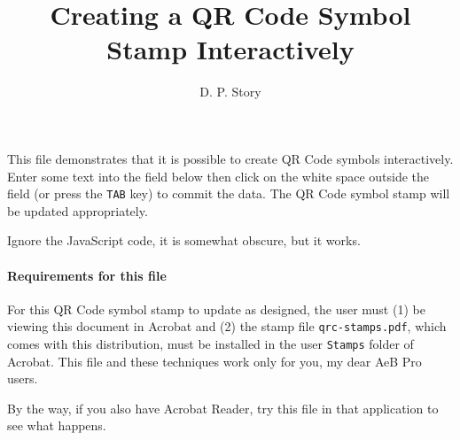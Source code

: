 \documentclass{article}
\title{Creating a QR Code Symbol Stamp Interactively}
\author{D. P. Story}
\begin{document}
\makeinlinetitle

This file demonstrates that it is possible to create QR Code symbols
interactively. Enter some text into the field below then click on the white
space outside the field (or press the \texttt{TAB} key) to commit the data.
The QR Code symbol stamp will be updated appropriately.

\space{}

Ignore the JavaScript code, it is somewhat obscure, but it works.

\paragraph*{Requirements for this file} For this QR Code symbol stamp to
update as designed, the user must (1) be viewing this document in
\textsf{Acrobat} and (2) the stamp file \texttt{qrc-stamps.pdf}, which comes
with this distribution, must be installed in the user \texttt{Stamps} folder
of \textsf{Acrobat}. This file and these techniques work only for you, my dear
AeB Pro users.

By the way, if you also have Acrobat Reader, try this file in that
application to see what happens.
\end{document}
